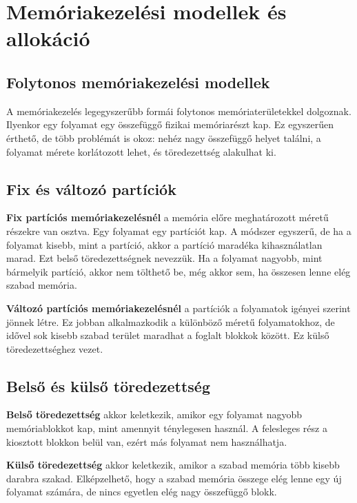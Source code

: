 \section{Memóriakezelési modellek és allokáció}

\subsection{Folytonos memóriakezelési modellek}

A memóriakezelés legegyszerűbb formái folytonos memóriaterületekkel dolgoznak. Ilyenkor egy folyamat egy összefüggő fizikai memóriarészt kap. Ez egyszerűen érthető, de több problémát is okoz: nehéz nagy összefüggő helyet találni, a folyamat mérete korlátozott lehet, és töredezettség alakulhat ki.

\begin{center}

\end{center}

\subsection{Fix és változó partíciók}

\textbf{Fix partíciós memóriakezelésnél} a memória előre meghatározott méretű részekre van osztva. Egy folyamat egy partíciót kap. A módszer egyszerű, de ha a folyamat kisebb, mint a partíció, akkor a partíció maradéka kihasználatlan marad. Ezt belső töredezettségnek nevezzük. Ha a folyamat nagyobb, mint bármelyik partíció, akkor nem tölthető be, még akkor sem, ha összesen lenne elég szabad memória.

\textbf{Változó partíciós memóriakezelésnél} a partíciók a folyamatok igényei szerint jönnek létre. Ez jobban alkalmazkodik a különböző méretű folyamatokhoz, de idővel sok kisebb szabad terület maradhat a foglalt blokkok között. Ez külső töredezettséghez vezet.

\subsection{Belső és külső töredezettség}

\textbf{Belső töredezettség} akkor keletkezik, amikor egy folyamat nagyobb memóriablokkot kap, mint amennyit ténylegesen használ. A felesleges rész a kiosztott blokkon belül van, ezért más folyamat nem használhatja.

\textbf{Külső töredezettség} akkor keletkezik, amikor a szabad memória több kisebb darabra szakad. Elképzelhető, hogy a szabad memória összege elég lenne egy új folyamat számára, de nincs egyetlen elég nagy összefüggő blokk.

